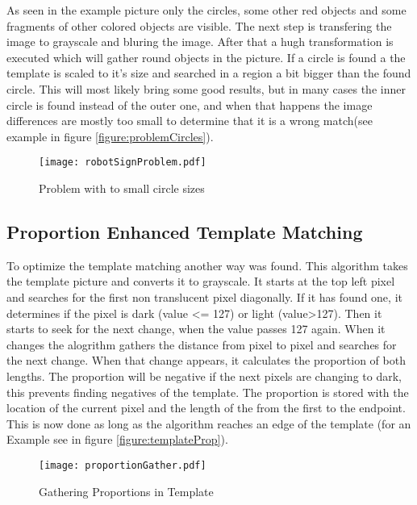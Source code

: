 As seen in the example picture only the circles, some other red objects and some fragments of
other colored objects are visible. The next step is transfering the image to grayscale and 
bluring the image. After that a hugh transformation is executed which will gather round
objects in the picture. If a circle is found a the template is scaled to it's size and 
searched in a region a bit bigger than the found circle.
\newpage
This will most likely bring some good results, but in many cases the inner circle is found
instead of the outer one, and when that happens the image differences are mostly too small
to determine that it is a wrong match(see example in figure \vref{figure:problemCircles}).

\begin{figure}[htp]
\begin{center}
  \texttt{[image: robotSignProblem.pdf]}
  \caption{Problem with to small circle sizes}
  \label{figure:problemCircles}
\end{center}
\end{figure}

\subsection{Proportion Enhanced Template Matching}
To optimize the template matching another way was found. This algorithm
takes the template picture and converts it to grayscale. It starts at the top left pixel
and searches for the first non translucent pixel diagonally. If it has found one,
it determines if the pixel is dark (value <= 127) or light (value>127). Then it
starts to seek for the next change, when the value passes 127 again.
When it changes the alogrithm gathers the distance from pixel to pixel and searches for the next change.
When that change appears, it calculates the proportion of both lengths.
The proportion will be negative if the next pixels are changing to dark, 
this prevents finding negatives of the template.  
The proportion is stored with the location of the current pixel and the
length of the from the first to the endpoint. This is now done as long
as the algorithm reaches an edge of the template (for an Example see in figure \vref{figure:templateProp}).

\begin{figure}[htp]
\begin{center}
  \texttt{[image: proportionGather.pdf]}
  \caption{Gathering Proportions in Template}
  \label{figure:templateProp}
\end{center}
\end{figure}

